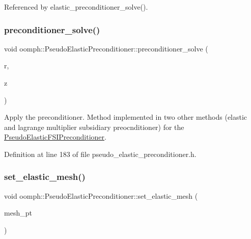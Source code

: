 Referenced by elastic\+\_\+preconditioner\+\_\+solve().

\mbox{\label{classoomph_1_1PseudoElasticPreconditioner_a2533d2574d2c7d6613fda72b96a5f885}} 
\subsubsection{\texorpdfstring{preconditioner\+\_\+solve()}{preconditioner\_solve()}}
{\footnotesize\ttfamily void oomph\+::\+Pseudo\+Elastic\+Preconditioner\+::preconditioner\+\_\+solve (\begin{DoxyParamCaption}\item[{const Double\+Vector \&}]{r,  }\item[{Double\+Vector \&}]{z }\end{DoxyParamCaption})\hspace{0.3cm}{\ttfamily [inline]}}



Apply the preconditioner. Method implemented in two other methods (elastic and lagrange multiplier subsidiary preocnditioner) for the \hyperlink{classoomph_1_1PseudoElasticFSIPreconditioner}{Pseudo\+Elastic\+F\+S\+I\+Preconditioner}. 



Definition at line 183 of file pseudo\+\_\+elastic\+\_\+preconditioner.\+h.

\mbox{\label{classoomph_1_1PseudoElasticPreconditioner_ae115b58574a36c2c8fecb2524afa54f1}} 
\subsubsection{\texorpdfstring{set\+\_\+elastic\+\_\+mesh()}{set\_elastic\_mesh()}}
{\footnotesize\ttfamily void oomph\+::\+Pseudo\+Elastic\+Preconditioner\+::set\+\_\+elastic\+\_\+mesh (\begin{DoxyParamCaption}\item[{Mesh $\ast$}]{mesh\+\_\+pt }\end{DoxyParamCaption})\hspace{0.3cm}{\ttfamily [inline]}}



